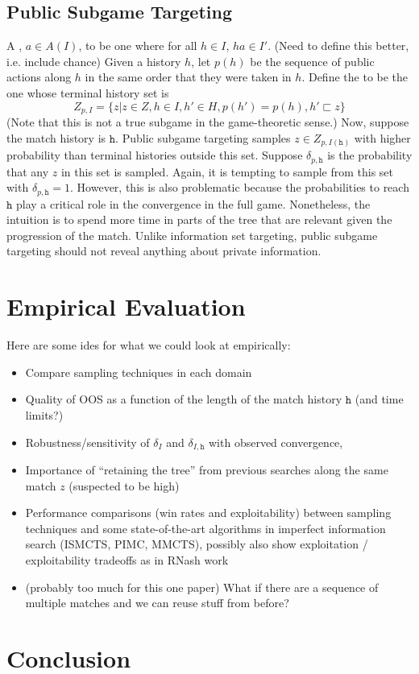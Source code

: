 \documentclass[letterpaper]{article}
\newcommand{\tth}{\mathtt{h}}
\newcommand{\defword}[1]{\textbf{\boldmath{#1}}}
\begin{document}
\subsection{Public Subgame Targeting}

A \defword{public action}, $a \in A(I)$, to be one where for all $h \in I$, $ha \in I'$. (Need to define this better, i.e. include chance) 
Given a history $h$, let $p(h)$ be the sequence of public actions along $h$ in the same order that they were taken in $h$. 
Define the \defword{public subgame induced by h} to be the one whose terminal history set is
\[Z_{p,I} = \{ z | z \in Z, h \in I, h' \in H, p(h') = p(h), h' \sqsubset z \}\]
(Note that this is not a true subgame in the game-theoretic sense.)
Now, suppose the match history is $\tth$.
Public subgame targeting samples $z \in Z_{p,I(\tth)}$ with higher probability than terminal histories outside this set. 
Suppose $\delta_{p,\tth}$ is the probability that any $z$ in this set is sampled. 
Again, it is tempting to sample from this set with $\delta_{p,\tth} = 1$. 
However, this is also problematic because the probabilities to reach $\tth$ play a critical role in the convergence in the full game. 
Nonetheless, the intuition is to spend more time in parts of the tree that are relevant given the progression of the match. Unlike 
information set targeting, public subgame targeting should not reveal anything about private information. 

\section{Empirical Evaluation}

Here are some ides for what we could look at empirically: 

\begin{itemize}
\item Compare sampling techniques in each domain
\item Quality of OOS as a function of the length of the match history $\tth$ (and time limits?)
\item Robustness/sensitivity of $\delta_I$ and $\delta_{I,\tth}$ with observed convergence,
\item Importance of ``retaining the tree'' from previous searches along the same match $z$ (suspected to be high)
\item Performance comparisons (win rates and exploitability) between sampling techniques and some state-of-the-art
algorithms in imperfect information search (ISMCTS, PIMC, MMCTS), 
possibly also show exploitation / exploitability tradeoffs as in RNash work
\item (probably too much for this one paper) What if there are a sequence of multiple matches and we can reuse stuff from before?
\end{itemize}


\section{Conclusion}



\end{document}
